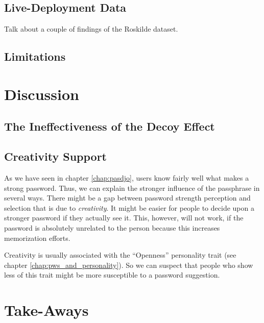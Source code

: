 \subsection{Live-Deployment Data}
Talk about a couple of findings of the Roskilde dataset. 

\subsection{Limitations}


\section{Discussion}

\subsection{The Ineffectiveness of the Decoy Effect}


\subsection{Creativity Support}
As we have seen in chapter \ref{chap:pasdjo}, users know fairly well what makes a strong password. Thus, we can explain the stronger influence of the passphrase in several ways. There might be a gap between password strength perception and selection that is due to \textit{creativity}. It might be easier for people to decide upon a stronger password if they actually see it. This, however, will not work, if the password is absolutely unrelated to the person because this increases memorization efforts. 

Creativity is usually associated with the ``Openness'' personality trait (see chapter \ref{chap:pws_and_personality}). So we can suspect that people who show less of this trait might be more susceptible to a password suggestion. 



\section{Take-Aways}



